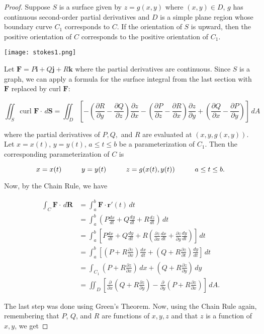 \documentclass[11pt,oneside,english]{amsart}
\theoremstyle{definition}
\newcommand{\pspace}{\hspace{10mm}}
\newcommand{\dd}[2]{\frac{d{#1}}{d{#2}}}
\newcommand{\pp}[2]{\frac{\partial{#1}}{\partial{#2}}}
\begin{document}
\begin{proof}

Suppose $S$ is a surface given by $z=g(x,y)$ where $(x,y)\in D$, $g$ has continuous second-order partial derivatives and $D$ is a simple plane region whose boundary curve $C_1$ corresponds to $C$. If the orientation of $S$ is upward, then the positive orientation of $C$ corresponds to the positive orientation of $C_1$. 

\begin{center}
\texttt{[image: stokes1.png]}
\end{center}

Let $\mathbf{F}=P\mathbf{i}+Q\mathbf{j}+R\mathbf{k}$ where the partial derivatives are continuous. Since $S$ is a graph, we can apply a formula for the surface integral from the last section with $\mathbf{F}$ replaced by curl $\mathbf{F}$:

\[
\iint_S\text{curl }\mathbf{F}\cdot\,d\mathbf{S}=\iint_D\left[-\left(\pp{R}{y}-\pp{Q}{z}\right)\pp{z}{x}-\left(\pp{P}{z}-\pp{R}{x}\right)\pp{z}{y}+\left(\pp{Q}{x}-\pp{P}{y}\right)\right]\,dA
\]
 
where the partial derivatives of $P,Q,$ and $R$ are evaluated at $(x,y,g(x,y))$. Let $x=x(t)$, $y=y(t)$, $a\leq t\leq b$ be a parameterization of $C_1$. Then the corresponding parameterization of $C$ is

\[
x=x(t)\pspace y=y(t)\pspace z=g(x(t),y(t))\pspace a\leq t\leq b.
\]

Now, by the Chain Rule, we have 

\begin{align*}
\int_C\mathbf{F}\cdot\,d\mathbf{R}&=\int_a^b\mathbf{F}\cdot\mathbf{r}'(t)\,dt\\[2mm]
&=\int_a^b\left(P\dd{x}{t}+Q\dd{y}{t}+R\dd{z}{t}\right)\,dt\\[2mm]
&=\int_a^b\left[P\dd{x}{t}+Q\dd{y}{t}+R\left(\pp{z}{x}\dd{x}{t}+\pp{z}{y}\dd{y}{t}\right)\right]\,dt\\[2mm]
&=\int_a^b\left[\left(P+R\pp{z}{x}\right)\dd{x}{t}+\left(Q+R\pp{z}{t}\right)\dd{y}{t}\right]\,dt\\[2mm]
&=\int_{C_1}\left(P+R\pp{z}{x}\right)\,dx+\left(Q+R\pp{z}{y}\right)\,dy\\[2mm]
&=\iint_D\left[\pp{}{x}\left(Q+R\pp{z}{y}\right)-\pp{}{y}\left(P+R\pp{z}{x}\right)\right]\,dA.
\end{align*}

The last step was done using Green's Theorem. Now, using the Chain Rule again, remembering that $P$, $Q$, and $R$ are functions of $x,y,z$ and that $z$ is a function of $x,y$, we get


\end{proof}
\end{document}
